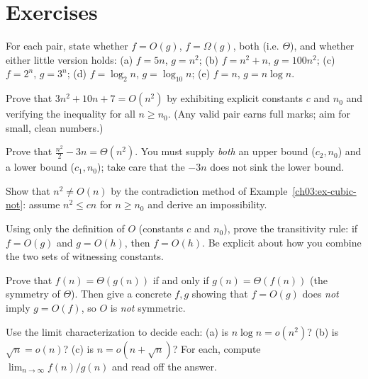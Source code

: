 \section{Exercises}

\begin{exercise}\label{ch03:ex-warm-classify}
For each pair, state whether $f = O(g)$, $f = \Omega(g)$, both (i.e. $\Theta$), and
whether either little version holds:
(a) $f = 5n$, $g = n^2$;\;
(b) $f = n^2 + n$, $g = 100n^2$;\;
(c) $f = 2^n$, $g = 3^n$;\;
(d) $f = \log_2 n$, $g = \log_{10} n$;\;
(e) $f = n$, $g = n\log n$.
\end{exercise}

\begin{exercise}\label{ch03:ex-find-constants}
Prove that $3n^2 + 10n + 7 = O(n^2)$ by exhibiting explicit constants $c$ and $n_0$ and
verifying the inequality for all $n \ge n_0$. (Any valid pair earns full marks; aim for
small, clean numbers.)
\end{exercise}

\begin{exercise}\label{ch03:ex-omega-proof}
Prove that $\frac{n^2}{2} - 3n = \Theta(n^2)$. You must supply \emph{both} an upper
bound ($c_2, n_0$) and a lower bound ($c_1, n_0$); take care that the $-3n$ does not
sink the lower bound.
\end{exercise}

\begin{exercise}\label{ch03:ex-disprove}
Show that $n^2 \ne O(n)$ by the contradiction method of
Example~\ref{ch03:ex-cubic-not}: assume $n^2 \le c n$ for $n \ge n_0$ and derive an
impossibility.
\end{exercise}

\begin{exercise}\label{ch03:ex-transitivity}
Using only the definition of $O$ (constants $c$ and $n_0$), prove the transitivity rule:
if $f = O(g)$ and $g = O(h)$, then $f = O(h)$. Be explicit about how you combine the two
sets of witnessing constants.
\end{exercise}

\begin{exercise}\label{ch03:ex-symmetry}
Prove that $f(n) = \Theta(g(n))$ if and only if $g(n) = \Theta(f(n))$ (the symmetry of
$\Theta$). Then give a concrete $f, g$ showing that $f = O(g)$ does \emph{not} imply
$g = O(f)$, so $O$ is \emph{not} symmetric.
\end{exercise}

\begin{exercise}\label{ch03:ex-littleo-limit}
Use the limit characterization to decide each: (a) is $n\log n = o(n^2)$? (b) is
$\sqrt{n} = o(n)$? (c) is $n = o(n + \sqrt n)$? For each, compute
$\lim_{n\to\infty} f(n)/g(n)$ and read off the answer.
\end{exercise}

